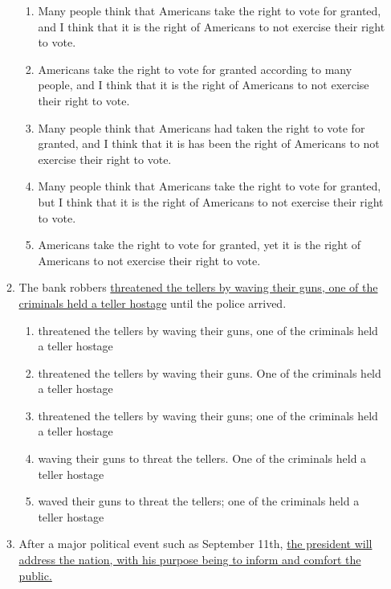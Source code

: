 \begin{enumerate}
\begin{enumerate}[label=(\Alph*)]
\bigskip
\begin{enumerate}[label=(\Alph*)]
\item Many people think that Americans take the right to vote for granted, and I think that it is the right of Americans to not exercise their right to vote. \hrulefill
\item Americans take the right to vote for granted according to many people, and I think that it is the right of Americans to not exercise their right to vote.\hrulefill
\item Many people think that Americans had taken the right to vote for granted, and I think that it is has been the right of Americans to not exercise their right to vote. \hrulefill
\item Many people think that Americans take the right to vote for granted, but I think that it is the right of Americans to not exercise their right to vote.\hrulefill
\item Americans take the right to vote for granted, yet it is the right of Americans to not exercise their right to vote.\hrulefill
\end{enumerate}

\bigskip
\item The bank robbers \ul{threatened the tellers by waving their guns, one of the criminals held a teller hostage} until the police arrived. 

\bigskip
\begin{enumerate}[label=(\Alph*)]
\item threatened the tellers by waving their guns, one of the criminals held a teller hostage \hrulefill
\item threatened the tellers by waving their guns. One of the criminals held a teller hostage\hrulefill
\item threatened the tellers by waving their guns; one of the criminals held a teller hostage\hrulefill
\item waving their guns to threat the tellers. One of the criminals held a teller hostage\hrulefill
\item waved their guns to threat the tellers; one of the criminals held a teller hostage\hrulefill
\end{enumerate}

\bigskip
\item After a major political event such as September 11th, \ul{the president will address the nation, with his purpose being to inform and comfort the public.}


\end{enumerate}
\end{enumerate}

